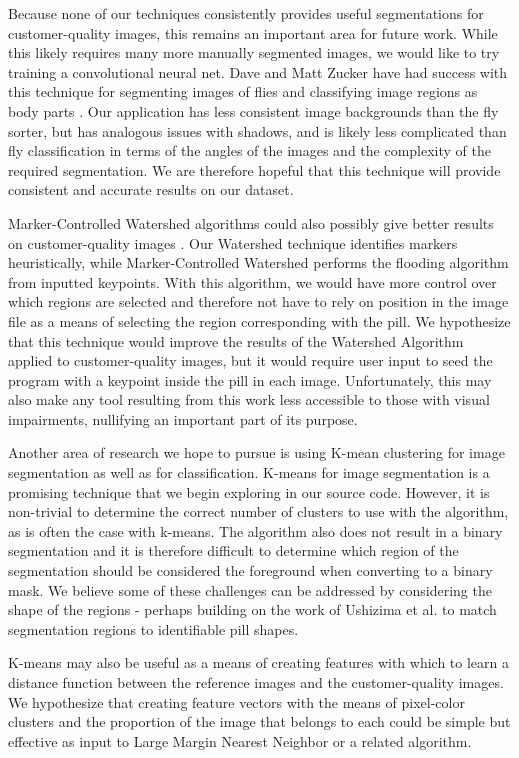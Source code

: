 \documentclass{article}
\begin{document}
Because none of our techniques consistently provides useful segmentations for customer-quality images, this remains an important area for future work. While this likely requires many more manually segmented images, we would like to try training a convolutional neural net. Dave and Matt Zucker have had success with this technique for segmenting images  of flies and classifying image regions as body parts \cite{mattzraps}. Our application has less consistent image backgrounds than the fly sorter, but has analogous issues with shadows, and is likely less complicated than fly classification in terms of the angles of the images and the complexity of the required segmentation. We are therefore hopeful that this technique will provide consistent and accurate results on our dataset. 

Marker-Controlled Watershed algorithms could also possibly give better results on customer-quality images \cite{image-seg}. Our Watershed technique identifies markers heuristically, while Marker-Controlled Watershed performs the flooding algorithm from inputted keypoints. With this algorithm, we would have more control over which regions are selected and therefore not have to rely on position in the image file as a means of selecting the region corresponding with the pill. We hypothesize that this technique would improve the results of the Watershed Algorithm applied to customer-quality images, but it would require user input to seed the program with a keypoint inside the pill in each image. Unfortunately, this may also make any tool resulting from this work less accessible to those with visual impairments, nullifying an important part of its purpose. 

Another area of research we hope to pursue is using K-mean clustering for image segmentation as well as for classification.  K-means for image segmentation is a promising technique that we begin exploring in our source code.  However, it is non-trivial to determine the correct number of clusters to use with the algorithm, as is often the case with k-means. The algorithm also does not result in a binary segmentation and it is therefore difficult to determine which region of the segmentation should be considered the foreground when converting to a binary mask. We believe some of these challenges can be addressed by considering the shape of the regions - perhaps building on the work of Ushizima et al. to match segmentation regions to identifiable pill shapes. 

K-means may also be useful as a means of creating features with which to learn a distance function between the reference images and the customer-quality images.  We hypothesize that creating feature vectors with the means of pixel-color clusters and the proportion of the image that belongs to each could be simple but effective as input to Large Margin Nearest Neighbor or a related algorithm. 
\end{document}
